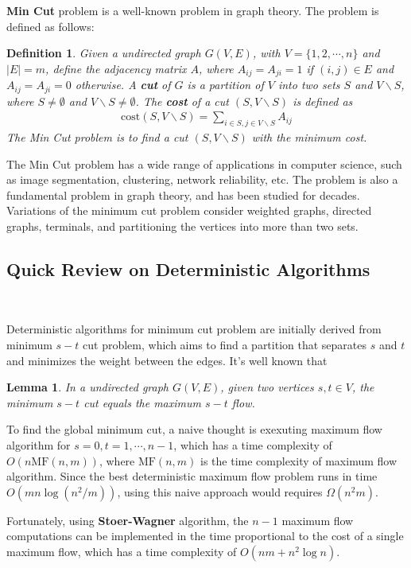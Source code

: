 \documentclass[12pt]{article}
\theoremstyle{plain}
\newtheorem{lemma}{Lemma}[section]
\newtheorem{definition}{Definition}[section]
\begin{document}
\textbf{Min Cut} problem is a well-known problem in graph theory. The problem is defined as follows: 
\begin{definition}
    Given a  undirected graph $G(V,E)$, with $V=\{1,2,\cdots,n\}$ and $|E|=m$, define the adjacency matrix $A$, where $A_{ij}=A_{ji}=1$ if $(i,j)\in E$ and $A_{ij}=A_{ji}=0$ otherwise. A \textbf{cut} of $G$ is a partition of $V$ into two sets $S$ and $V\backslash S$, where $S\neq\emptyset$ and $V\backslash S\neq\emptyset$. The \textbf{cost} of a cut $(S,V\backslash S)$ is defined as
    \begin{align*}
        \text{cost}(S,V\backslash S)=\sum_{i\in S, j\in V\backslash S}A_{ij}
    \end{align*}
    The Min Cut problem is to find a cut $(S,V\backslash S)$ with the minimum cost.
\end{definition}

The Min Cut problem has a wide range of applications in computer science, such as image segmentation, clustering, network reliability, etc. The problem is also a fundamental problem in graph theory, and has been studied for decades. Variations of the minimum cut problem consider weighted graphs, directed graphs, terminals, and partitioning the vertices into more than two sets.

\subsection{Quick Review on Deterministic Algorithms}\

Deterministic algorithms for minimum cut problem are initially derived from minimum $s-t$ cut problem, which aims to find a partition that separates $s$ and $t$ and minimizes the weight between the edges. It's well known that 
\begin{lemma}
    In a undirected graph $G(V,E)$, given two vertices $s,t\in V$, the minimum $s-t$ cut equals the maximum $s-t$ flow.
\end{lemma}
To find the global minimum cut, a naive thought is exexuting maximum flow algorithm for $s=0,t=1,\cdots,n-1$, which has a time complexity of $O(n\text{MF}(n,m))$, where $\text{MF}(n,m)$ is the time complexity of maximum flow algorithm. Since the best deterministic maximum flow problem runs in time $O(mn\log(n^2/m))$, using this naive approach would requires $\Omega(n^2m)$. 

Fortunately, using \textbf{Stoer-Wagner}\cite{stoer1997simple} algorithm, the $n-1$ maximum flow computations can be implemented in the time proportional to the cost of a single maximum flow, which has a time complexity of $O(nm+n^2\log n)$. 
\end{document}
